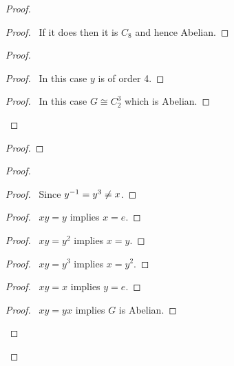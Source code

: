 \begin{proof}
\pf
{}
\begin{proof}
	\pf\ If it does then it is $C_8$ and hence Abelian.
\end{proof}
\begin{proof}
	\begin{proof}
		\pf\ In this case $y$ is of order 4.
	\end{proof}
	\begin{proof}
		\pf\ In this case $G \cong C_2^3$ which is Abelian.
	\end{proof}
\end{proof}
\begin{proof}
\end{proof}
\begin{proof}
	\begin{proof}
		\pf\ Since ${y}^{-1} = y^3 \neq x$.
	\end{proof}
	\begin{proof}
		\pf\ $xy = y$ implies $x=e$.
	\end{proof}
	\begin{proof}
		\pf\ $xy = y^2$ implies $x = y$.
	\end{proof}
	\begin{proof}
		\pf\ $xy = y^3$ implies $x = y^2$.
	\end{proof}
	\begin{proof}
		\pf\ $xy = x$ implies $y = e$.
	\end{proof}
	\begin{proof}
		\pf\ $xy = yx$ implies $G$ is Abelian.
	\end{proof}

\end{proof}
\end{proof}
